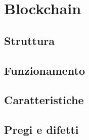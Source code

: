 
\chapter{Blockchain}
\label{cap:blockchain}

\section{Struttura}

\section{Funzionamento}

\section{Caratteristiche}

\section{Pregi e difetti}
